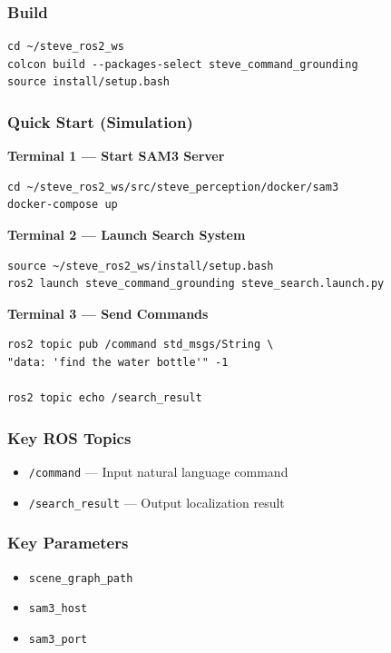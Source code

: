 \documentclass[12pt,oneside,a4paper]{article}
\begin{document}
\subsubsection{Build}

\begin{lstlisting}[style=bashstyle]
cd ~/steve_ros2_ws
colcon build --packages-select steve_command_grounding
source install/setup.bash
\end{lstlisting}

\subsubsection{Quick Start (Simulation)}

\textbf{Terminal 1 — Start SAM3 Server}
\begin{lstlisting}[style=bashstyle]
cd ~/steve_ros2_ws/src/steve_perception/docker/sam3
docker-compose up
\end{lstlisting}

\textbf{Terminal 2 — Launch Search System}
\begin{lstlisting}[style=bashstyle]
source ~/steve_ros2_ws/install/setup.bash
ros2 launch steve_command_grounding steve_search.launch.py
\end{lstlisting}

\textbf{Terminal 3 — Send Commands}
\begin{lstlisting}[style=bashstyle]
ros2 topic pub /command std_msgs/String \
"data: 'find the water bottle'" -1

ros2 topic echo /search_result
\end{lstlisting}

\subsubsection{Key ROS Topics}

\begin{itemize}
    \item \texttt{/command} — Input natural language command
    \item \texttt{/search\_result} — Output localization result
\end{itemize}

\subsubsection{Key Parameters}

\begin{itemize}
    \item \texttt{scene\_graph\_path}
    \item \texttt{sam3\_host}
    \item \texttt{sam3\_port}
\end{itemize}
\end{document}

